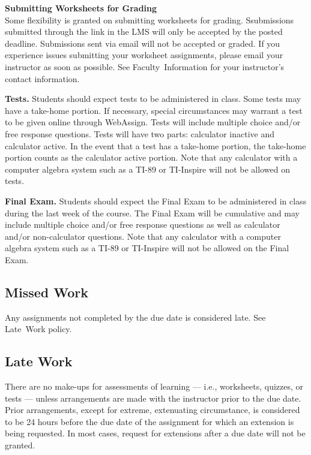 \documentclass[11pt]{article}
\renewenvironment{framed}[1][]{%
  \def\FrameCommand{%
    \hspace{1pt}%
    {\color{mybordercolor}\vrule width 2pt} %
    \hspace{1pt}%
    \fboxsep=\FrameSep%
    \colorbox{mybgcolor}%
  }%
  \MakeFramed {\advance\hsize-\width \FrameRestore}%
}{%
  \endMakeFramed
}
\begin{document}
\begin{framed}
\textbf{Submitting Worksheets for Grading}\\
Some flexibility is granted on submitting worksheets for grading. Ssubmissions submitted through the link in the LMS will only be accepted by the posted deadline. Submissions sent via email will not be accepted or graded. If you experience issues submitting your worksheet assignments, please email your instructor as soon as possible. See Faculty~Information for your instructor's contact information.
\end{framed}

\textbf{Tests.} Students should expect tests to be administered in class. Some tests may have a take-home portion. If necessary, special circumstances may warrant a test to be given online through WebAssign. Tests will include multiple choice and/or free response questions. Tests will have two parts: calculator inactive and calculator active. In the event that a test has a take-home portion, the take-home portion counts as the calculator active portion. Note that any calculator with a computer algebra system such as a TI-89 or TI-Inspire will not be allowed on tests.

\textbf{Final Exam.} Students should expect the Final Exam to be administered in class during the last week of the course. The Final Exam will be cumulative and may include multiple choice and/or free response questions as well as calculator and/or non-calculator questions. Note that any calculator with a computer algebra system such as a TI-89 or TI-Inspire will not be allowed on the Final Exam.

\subsection{Missed Work}

Any assignments not completed by the due date is considered late. See Late~Work policy.

\subsection{Late Work}

There are no make-ups for assessments of learning --- i.e., worksheets, quizzes, or tests --- unless arrangements are made with the instructor prior to the due date. Prior arrangements, except for extreme, extenuating circumstance, is considered to be 24 hours before the due date of the assignment for which an extension is being requested. In most cases, request for extensions after a due date will not be granted.
\end{document}
